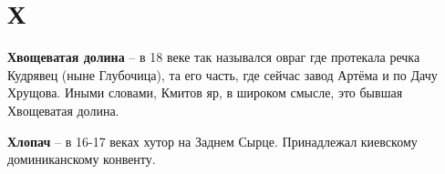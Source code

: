 \chapter*{Х}

\textbf{Хвощеватая долина} – в 18 веке так назывался овраг где протекала речка Кудрявец (ныне Глубочица), та его часть, где сейчас завод Артёма и по Дачу Хрущова. Иными словами, Кмитов яр, в широком смысле, это бывшая Хвощеватая долина.\\

\medskip

\textbf{Хлопач} – в 16-17 веках хутор на Заднем Сырце. Принадлежал киевскому доминиканскому конвенту.